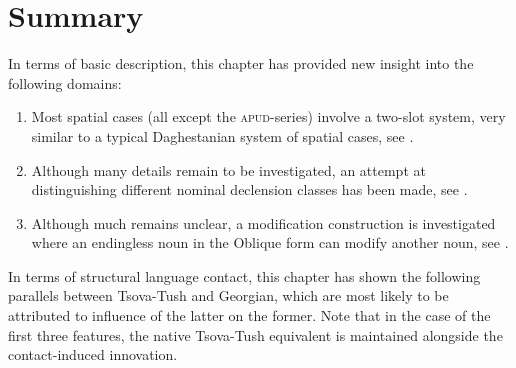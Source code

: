 \section{Summary}

In terms of basic description, this chapter has provided new insight into the following domains:

\begin{enumerate}
	\item Most spatial cases (all except the \textsc{apud}-series) involve a two-slot system, very similar to a typical Daghestanian system of spatial cases, see .
	
	\item Although many details remain to be investigated, an attempt at distinguishing different nominal declension classes has been made, see .
	
	\item Although much remains unclear, a modification construction is investigated where an endingless noun in the Oblique form can modify another noun, see .
	
\end{enumerate}


In terms of structural language contact, this chapter has shown the following parallels between Tsova-Tush and Georgian, which are most likely to be attributed to influence of the latter on the former. Note that in the case of the first three features, the native Tsova-Tush equivalent is maintained alongside the contact-induced innovation.

